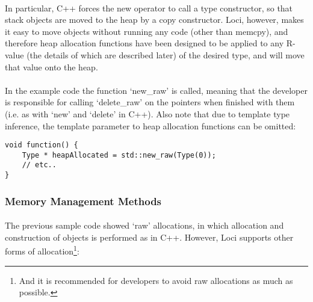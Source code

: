\documentclass[12pt,twoside,notitlepage]{report}
\begin{document}
\paragraph{}
In particular, C++ forces the new operator to call a type constructor, so that stack objects are moved to the heap by a copy constructor. Loci, however, makes it easy to move objects without running any code (other than memcpy), and therefore heap allocation functions have been designed to be applied to any R-value (the details of which are described later) of the desired type, and will move that value onto the heap.

\paragraph{}
In the example code the function `new\_raw' is called, meaning that the developer is responsible for calling `delete\_raw' on the pointers when finished with them (i.e. as with `new' and `delete' in C++). Also note that due to template type inference, the template parameter to heap allocation functions can be omitted:


\begin{lstlisting}
void function() {
	Type * heapAllocated = std::new_raw(Type(0));
	// etc..
}
\end{lstlisting}


\clearpage

\subsubsection{Memory Management Methods}

\paragraph{}
The previous sample code showed `raw' allocations, in which allocation and construction of objects is performed as in C++. However, Loci supports other forms of allocation\footnote{And it is recommended for developers to avoid raw allocations as much as possible.}:
\end{document}

